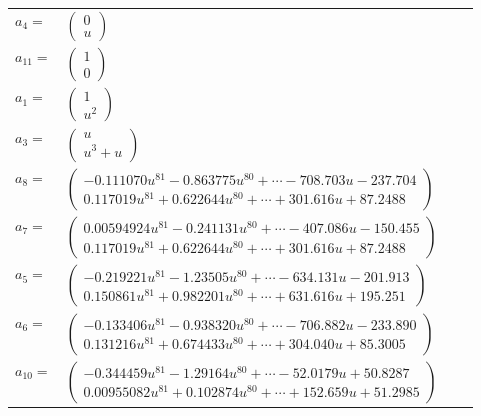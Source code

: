 \documentclass[1p]{elsarticle_modified}
\theoremstyle{definition}
\begin{document}
\begin{tabular}{m{7pt} m{180pt} m{7pt} m{180pt} }
\flushright $a_{4}=$&$\begin{pmatrix}0\\u\end{pmatrix}$ \\
\flushright $a_{11}=$&$\begin{pmatrix}1\\0\end{pmatrix}$ \\
\flushright $a_{1}=$&$\begin{pmatrix}1\\u^2\end{pmatrix}$ \\
\flushright $a_{3}=$&$\begin{pmatrix}u\\u^3+u\end{pmatrix}$ \\
\flushright $a_{8}=$&$\begin{pmatrix}-0.111070 u^{81}-0.863775 u^{80}+\cdots-708.703 u-237.704\\0.117019 u^{81}+0.622644 u^{80}+\cdots+301.616 u+87.2488\end{pmatrix}$ \\
\flushright $a_{7}=$&$\begin{pmatrix}0.00594924 u^{81}-0.241131 u^{80}+\cdots-407.086 u-150.455\\0.117019 u^{81}+0.622644 u^{80}+\cdots+301.616 u+87.2488\end{pmatrix}$ \\
\flushright $a_{5}=$&$\begin{pmatrix}-0.219221 u^{81}-1.23505 u^{80}+\cdots-634.131 u-201.913\\0.150861 u^{81}+0.982201 u^{80}+\cdots+631.616 u+195.251\end{pmatrix}$ \\
\flushright $a_{6}=$&$\begin{pmatrix}-0.133406 u^{81}-0.938320 u^{80}+\cdots-706.882 u-233.890\\0.131216 u^{81}+0.674433 u^{80}+\cdots+304.040 u+85.3005\end{pmatrix}$ \\
\flushright $a_{10}=$&$\begin{pmatrix}-0.344459 u^{81}-1.29164 u^{80}+\cdots-52.0179 u+50.8287\\0.00955082 u^{81}+0.102874 u^{80}+\cdots+152.659 u+51.2985\end{pmatrix}$ \\

\end{tabular}
\end{document}
